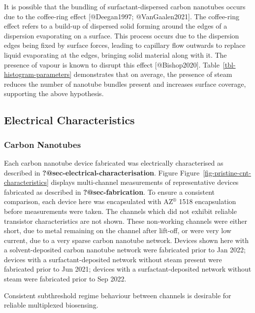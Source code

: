 \documentclass[
  letterpaper,
  DIV=11,
  numbers=noendperiod]{scrartcl}
\begin{document}
It is possible that the bundling of surfactant-dispersed carbon
nanotubes occurs due to the coffee-ring effect {[}@Deegan1997;
@VanGaalen2021{]}. The coffee-ring effect refers to a build-up of
dispersed solid forming around the edges of a dispersion evaporating on
a surface. This process occurs due to the dispersion edges being fixed
by surface forces, leading to capillary flow outwards to replace liquid
evaporating at the edges, bringing solid material along with it. The
presence of vapour is known to disrupt this effect {[}@Bishop2020{]}.
Table~\ref{tbl-histogram-parameters} demonstrates that on average, the
presence of steam reduces the number of nanotube bundles present and
increases surface coverage, supporting the above hypothesis.

\hypertarget{sec-pristine-electrical-characterisation}{%
\subsection{Electrical
Characteristics}\label{sec-pristine-electrical-characterisation}}

\hypertarget{carbon-nanotubes}{%
\subsubsection{Carbon Nanotubes}\label{carbon-nanotubes}}

Each carbon nanotube device fabricated was electrically characterised as
described in \textbf{?@sec-electrical-characterisation}. Figure
Figure~\ref{fig-pristine-cnt-characteristics} displays multi-channel
measurements of representative devices fabricated as described in
\textbf{?@sec-fabrication}. To ensure a consistent comparison, each
device here was encapsulated with AZ\(^\circledR\) 1518 encapsulation
before measurements were taken. The channels which did not exhibit
reliable transistor characteristics are not shown. These non-working
channels were either short, due to metal remaining on the channel after
lift-off, or were very low current, due to a very sparse carbon nanotube
network. Devices shown here with a solvent-deposited carbon nanotube
network were fabricated prior to Jan 2022; devices with a
surfactant-deposited network without steam present were fabricated prior
to Jun 2021; devices with a surfactant-deposited network without steam
were fabricated prior to Sep 2022.

Consistent subthreshold regime behaviour between channels is desirable
for reliable multiplexed biosensing.
\end{document}
